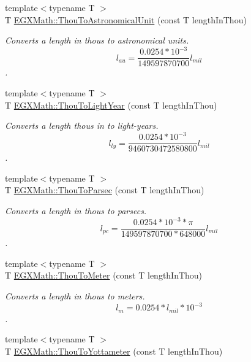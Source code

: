 \begin{DoxyCompactItemize}
\item 
{\footnotesize template$<$typename T $>$ }\\T \mbox{\hyperlink{group___e_g_x_math-_conversions-_length_conversions-_imperial-_thou-_astronomical_gaf6e57bc733c3644d4ca1a6c0bb836b42}{E\+G\+X\+Math\+::\+Thou\+To\+Astronomical\+Unit}} (const T length\+In\+Thou)
\begin{DoxyCompactList}\small\item\em Converts a length in thous to astronomical units. \[ l_{au}=\frac{0.0254 * 10^{-3}}{149597870700} l_{mil} \]. \end{DoxyCompactList}\item 
{\footnotesize template$<$typename T $>$ }\\T \mbox{\hyperlink{group___e_g_x_math-_conversions-_length_conversions-_imperial-_thou-_astronomical_gab36cdfc79de8c7cde7dedb7b08a6323e}{E\+G\+X\+Math\+::\+Thou\+To\+Light\+Year}} (const T length\+In\+Thou)
\begin{DoxyCompactList}\small\item\em Converts a length thous in to light-\/years. \[ l_{ly}=\frac{0.0254 * 10^{-3}}{9460730472580800} l_{mil} \]. \end{DoxyCompactList}\item 
{\footnotesize template$<$typename T $>$ }\\T \mbox{\hyperlink{group___e_g_x_math-_conversions-_length_conversions-_imperial-_thou-_astronomical_gaa2a5b00bb5a83ba8f22f9c2f15ecc112}{E\+G\+X\+Math\+::\+Thou\+To\+Parsec}} (const T length\+In\+Thou)
\begin{DoxyCompactList}\small\item\em Converts a length in thous to parsecs. \[ l_{pc}=\frac{0.0254 * 10^{-3} * \pi}{149597870700 * 648000} l_{mil} \]. \end{DoxyCompactList}\item 
{\footnotesize template$<$typename T $>$ }\\T \mbox{\hyperlink{group___e_g_x_math-_conversions-_length_conversions-_imperial-_thou-_s_i_ga0d5d19b317eee7fc8c2a4c24195e8ed5}{E\+G\+X\+Math\+::\+Thou\+To\+Meter}} (const T length\+In\+Thou)
\begin{DoxyCompactList}\small\item\em Converts a length in thous to meters. \[ l_{m}=0.0254 * l_{mil} * 10^{-3} \]. \end{DoxyCompactList}\item 
{\footnotesize template$<$typename T $>$ }\\T \mbox{\hyperlink{group___e_g_x_math-_conversions-_length_conversions-_imperial-_thou-_s_i_ga289b200bab4328ce7bcde4464d91c62a}{E\+G\+X\+Math\+::\+Thou\+To\+Yottameter}} (const T length\+In\+Thou)

\end{DoxyCompactItemize}
